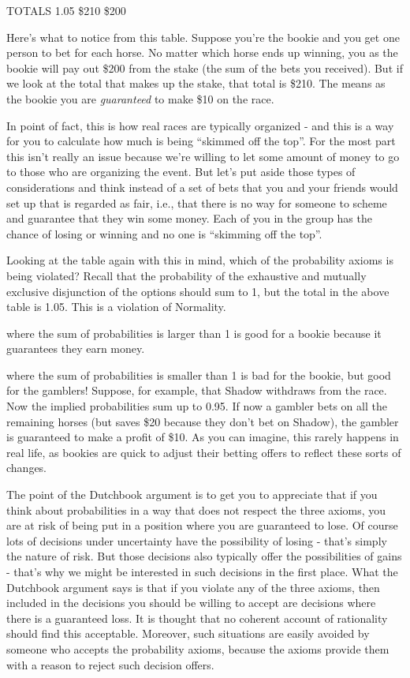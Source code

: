 \documentclass[]{tufte-book}
\begin{document}
TOTALS 1.05 \$210 \$200

Here's what to notice from this table. Suppose you're the bookie and you get one person to bet for each horse. No matter which horse ends up winning, you as the bookie will pay out \$200 from the stake (the sum of the bets you received). But if we look at the total that makes up the stake, that total is \$210. The means as the bookie you are \emph{guaranteed} to make \$10 on the race.

In point of fact, this is how real races are typically organized - and this is a way for you to calculate how much is being ``skimmed off the top''. For the most part this isn't really an issue because we're willing to let some amount of money to go to those who are organizing the event. But let's put aside those types of considerations and think instead of a set of bets that you and your friends would set up that is regarded as fair, i.e., that there is no way for someone to scheme and guarantee that they win some money. Each of you in the group has the chance of losing or winning and no one is ``skimming off the top''.

Looking at the table again with this in mind, which of the probability axioms is being violated? Recall that the probability of the exhaustive and mutually exclusive disjunction of the options should sum to 1, but the total in the above table is 1.05. This is a violation of Normality.

 where the sum of probabilities is larger than 1 is good for a bookie because it guarantees they earn money.

 where the sum of probabilities is smaller than 1 is bad for the bookie, but good for the gamblers! Suppose, for example, that Shadow withdraws from the race. Now the implied probabilities sum up to 0.95. If now a gambler bets on all the remaining horses (but saves \$20 because they don't bet on Shadow), the gambler is guaranteed to make a profit of \$10. As you can imagine, this rarely happens in real life, as bookies are quick to adjust their betting offers to reflect these sorts of changes.

The point of the Dutchbook argument is to get you to appreciate that if you think about probabilities in a way that does not respect the three axioms, you are at risk of being put in a position where you are guaranteed to lose. Of course lots of decisions under uncertainty have the possibility of losing - that's simply the nature of risk. But those decisions also typically offer the possibilities of gains - that's why we might be interested in such decisions in the first place. What the Dutchbook argument says is that if you violate any of the three axioms, then included in the decisions you should be willing to accept are decisions where there is a guaranteed loss. It is thought that no coherent account of rationality should find this acceptable. Moreover, such situations are easily avoided by someone who accepts the probability axioms, because the axioms provide them with a reason to reject such decision offers.
\end{document}
